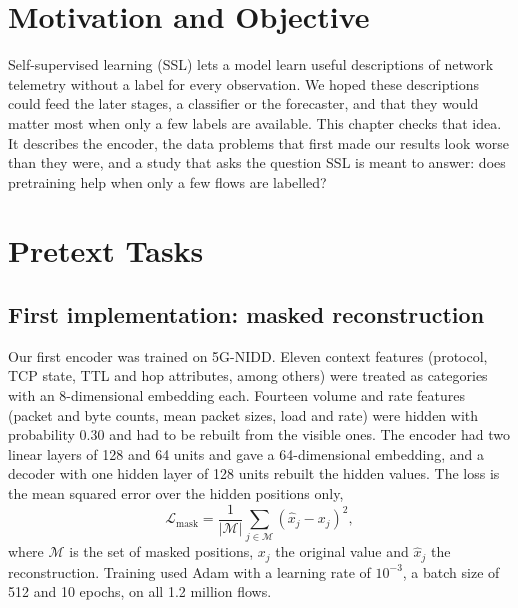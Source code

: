 \label{chap.5}
\section{Motivation and Objective}
Self-supervised learning (SSL) lets a model learn useful descriptions of network telemetry without a label for every observation. We hoped these descriptions could feed the later stages, a classifier or the forecaster, and that they would matter most when only a few labels are available. This chapter checks that idea. It describes the encoder, the data problems that first made our results look worse than they were, and a study that asks the question SSL is meant to answer: does pretraining help when only a few flows are labelled?

\section{Pretext Tasks}
\subsection{First implementation: masked reconstruction}
Our first encoder was trained on 5G-NIDD. Eleven context features (protocol, TCP state, TTL and hop attributes, among others) were treated as categories with an 8-dimensional embedding each. Fourteen volume and rate features (packet and byte counts, mean packet sizes, load and rate) were hidden with probability 0.30 and had to be rebuilt from the visible ones. The encoder had two linear layers of 128 and 64 units and gave a 64-dimensional embedding, and a decoder with one hidden layer of 128 units rebuilt the hidden values. The loss is the mean squared error over the hidden positions only,
\begin{equation}
\mathcal{L}_{\mathrm{mask}} = \frac{1}{|\mathcal{M}|}\sum_{j\in\mathcal{M}}(\hat{x}_j-x_j)^2 ,
\label{eq:mask_loss}
\end{equation}
where $\mathcal{M}$ is the set of masked positions, $x_j$ the original value and $\hat{x}_j$ the reconstruction. Training used Adam with a learning rate of $10^{-3}$, a batch size of 512 and 10 epochs, on all 1.2 million flows.

